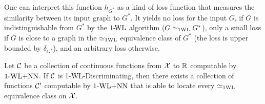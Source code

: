 One can interpret this function $h_{G^*}$ as a kind of loss function that measures the similarity between its input graph to $G^*$. It yields no loss for the input $G$, if $G$ is indistinguishable from $G^*$ by the $\text{1-\!WL}$ algorithm ($G \simeq_{\text{1WL}} G^*$), only a small loss if $G$ is close to a graph in the $\simeq_{\text{1WL}}$ equivalence class of $G^*$ (the loss is upper bounded by $\delta_{G^*}$), and an arbitrary loss otherwise.

\begin{lemma}\label{lem:continuous_proof1}
    Let $\mathcal{C}$ be a collection of continuous functions from $\mathcal{X}$ to $\mathbb{R}$ computable by $\text{1-WL+NN}$. If $\mathcal{C}$ is 1-\!WL-Discriminating, then there exists a collection of functions $\mathcal{C}'$ computable by $\text{1-WL+NN}$ that is able to locate every $\simeq_{\text{1WL}}$ equivalence class on $\mathcal{X}$.
\end{lemma}

